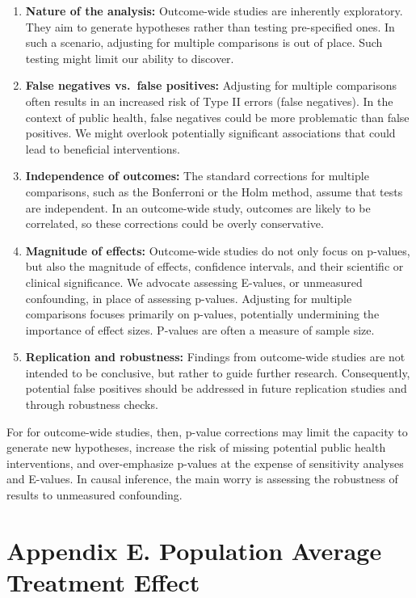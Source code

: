 \documentclass[
  singlecolumn]{report}
\begin{document}
\begin{enumerate}
\def\labelenumi{\arabic{enumi}.}
\item
  \textbf{Nature of the analysis:} Outcome-wide studies are inherently
  exploratory. They aim to generate hypotheses rather than testing
  pre-specified ones. In such a scenario, adjusting for multiple
  comparisons is out of place. Such testing might limit our ability to
  discover.
\item
  \textbf{False negatives vs.~false positives:} Adjusting for multiple
  comparisons often results in an increased risk of Type II errors
  (false negatives). In the context of public health, false negatives
  could be more problematic than false positives. We might overlook
  potentially significant associations that could lead to beneficial
  interventions.
\item
  \textbf{Independence of outcomes:} The standard corrections for
  multiple comparisons, such as the Bonferroni or the Holm method,
  assume that tests are independent. In an outcome-wide study, outcomes
  are likely to be correlated, so these corrections could be overly
  conservative.
\item
  \textbf{Magnitude of effects:} Outcome-wide studies do not only focus
  on p-values, but also the magnitude of effects, confidence intervals,
  and their scientific or clinical significance. We advocate assessing
  E-values, or unmeasured confounding, in place of assessing p-values.
  Adjusting for multiple comparisons focuses primarily on p-values,
  potentially undermining the importance of effect sizes. P-values are
  often a measure of sample size.
\item
  \textbf{Replication and robustness:} Findings from outcome-wide
  studies are not intended to be conclusive, but rather to guide further
  research. Consequently, potential false positives should be addressed
  in future replication studies and through robustness checks.
\end{enumerate}

For for outcome-wide studies, then, p-value corrections may limit the
capacity to generate new hypotheses, increase the risk of missing
potential public health interventions, and over-emphasize p-values at
the expense of sensitivity analyses and E-values. In causal inference,
the main worry is assessing the robustness of results to unmeasured
confounding.

\newpage{}

\hypertarget{appendix-e.-population-average-treatment-effect}{%
\section{Appendix E. Population Average Treatment
Effect}\label{appendix-e.-population-average-treatment-effect}}
\end{document}
